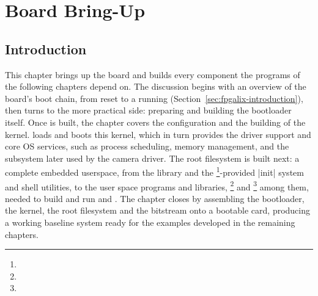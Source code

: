 \chapter{Board Bring-Up}
\label{chap:fpgalix-board-bring-up}

\section{Introduction}

This chapter brings up the  board and builds every component the programs of the following chapters depend on. The discussion begins with an overview of the board's boot chain, from reset to a running  (Section~\ref{sec:fpgalix-introduction}), then turns to the more practical side: preparing and building the bootloader itself. Once  is built, the chapter covers the configuration and the building of the  kernel.  loads and boots this kernel, which in turn provides the driver support and core OS services, such as process scheduling, memory management, and the  subsystem later used by the camera driver. The  root filesystem is built next: a complete embedded  userspace, from the  library and the \footnote{}-provided |init| system and shell utilities, to the user space programs and libraries, \footnote{} and \footnote{} among them, needed to build and run  and . The chapter closes by assembling the bootloader, the kernel, the root filesystem and the  bitstream onto a bootable  card, producing a working baseline system ready for the examples developed in the remaining chapters.

